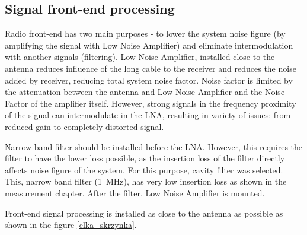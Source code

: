 \subsection{Signal front-end processing}
Radio front-end has two main purposes - to lower the system noise figure (by amplifying the signal with Low Noise Amplifier) and eliminate intermodulation with another signals (filtering). Low Noise Amplifier, installed close to the antenna reduces influence of the long cable to the receiver and reduces the noise added by receiver, reducing total system noise factor. Noise factor is limited by the attenuation between the antenna and Low Noise Amplifier and the Noise Factor of the amplifier itself. However, strong signals in the frequency proximity of the signal can intermodulate in the LNA, resulting in variety of issues: from reduced gain to completely distorted signal.

Narrow-band filter should be installed before the LNA. However, this requires the filter to have the lower loss possible, as the insertion loss of the filter directly affects noise figure of the system. For this purpose, cavity filter was selected. This, narrow band filter (\SI{1}{\MHz}), has very low insertion loss as shown in the measurement chapter. After the filter, Low Noise Amplifier is mounted.

Front-end signal processing is installed as close to the antenna as possible as shown in the figure \ref{elka_skrzynka}.


